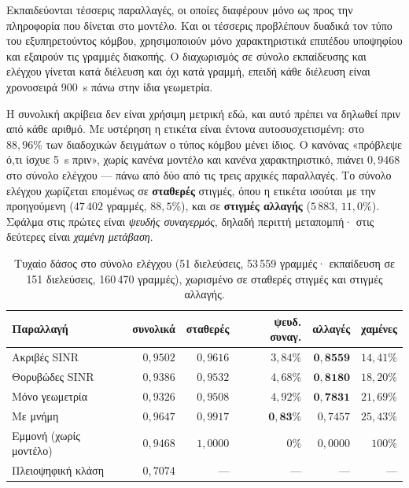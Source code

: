 \documentclass[11pt,a4paper]{article}
\begin{document}
Εκπαιδεύονται τέσσερις παραλλαγές, οι οποίες διαφέρουν μόνο ως προς την
πληροφορία που δίνεται στο μοντέλο. Και οι τέσσερις προβλέπουν δυαδικά τον
τύπο του εξυπηρετούντος κόμβου, χρησιμοποιούν μόνο χαρακτηριστικά επιπέδου
υποψηφίου και εξαιρούν τις γραμμές διακοπής. Ο διαχωρισμός σε σύνολο
εκπαίδευσης και ελέγχου γίνεται κατά διέλευση και όχι κατά γραμμή, επειδή κάθε
διέλευση είναι χρονοσειρά 900~s πάνω στην ίδια γεωμετρία.

Η συνολική ακρίβεια δεν είναι χρήσιμη μετρική εδώ, και αυτό πρέπει να
δηλωθεί πριν από κάθε αριθμό. Με υστέρηση η ετικέτα είναι έντονα
αυτοσυσχετισμένη: στο $88{,}96\%$ των διαδοχικών δειγμάτων ο τύπος κόμβου
μένει ίδιος. Ο κανόνας «πρόβλεψε ό,τι ίσχυε 5~s πριν», χωρίς κανένα μοντέλο και
κανένα χαρακτηριστικό, πιάνει $0{,}9468$ στο σύνολο ελέγχου — πάνω από δύο από
τις τρεις αρχικές παραλλαγές. Το σύνολο ελέγχου χωρίζεται επομένως σε
\textbf{σταθερές} στιγμές, όπου η ετικέτα ισούται με την προηγούμενη
($47\,402$ γραμμές, $88{,}5\%$), και σε \textbf{στιγμές αλλαγής}
($5\,883$, $11{,}0\%$). Σφάλμα στις πρώτες είναι \emph{ψευδής συναγερμός},
δηλαδή περιττή μεταπομπή· στις δεύτερες είναι \emph{χαμένη μετάβαση}.

\begin{table}[htbp]
\centering\small
\caption{Τυχαίο δάσος στο σύνολο ελέγχου (51 διελεύσεις, 53\,559 γραμμές·
εκπαίδευση σε 151 διελεύσεις, 160\,470 γραμμές), χωρισμένο σε σταθερές στιγμές
και στιγμές αλλαγής.}
\label{tab:ml}
\begin{tabular}{@{}lrrrrr@{}}
\toprule
Παραλλαγή & συνολικά & σταθερές & ψευδ. συναγ. & αλλαγές & χαμένες \\
\midrule
Ακριβές SINR      & $0{,}9502$ & $0{,}9616$ & $3{,}84\%$ & $\mathbf{0{,}8559}$ & $14{,}41\%$ \\
Θορυβώδες SINR    & $0{,}9386$ & $0{,}9532$ & $4{,}68\%$ & $\mathbf{0{,}8180}$ & $18{,}20\%$ \\
Μόνο γεωμετρία    & $0{,}9326$ & $0{,}9508$ & $4{,}92\%$ & $\mathbf{0{,}7831}$ & $21{,}69\%$ \\
Με μνήμη          & $0{,}9647$ & $0{,}9917$ & $\mathbf{0{,}83\%}$ & $0{,}7457$ & $25{,}43\%$ \\
\midrule
Εμμονή (χωρίς μοντέλο) & $0{,}9468$ & $1{,}0000$ & $0\%$ & $0{,}0000$ & $100\%$ \\
Πλειοψηφική κλάση      & $0{,}7074$ & — & — & — & — \\
\bottomrule
\end{tabular}
\end{table}
\end{document}
